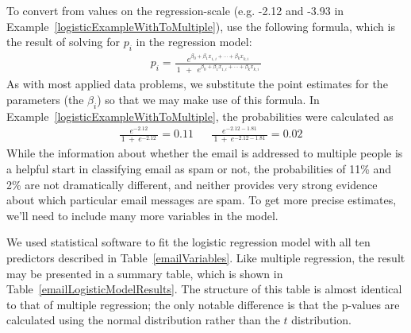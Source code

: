 To convert from values on the regression-scale (e.g. -2.12 and -3.93 in Example~\ref{logisticExampleWithToMultiple}), use the following formula, which is the result of solving for $p_i$ in the regression model:
\begin{align*}
p_i
	= \frac{e^{\beta_0 + \beta_1 x_{1,i}+\cdots+\beta_k x_{k,i}}}
		{\ 1\ \ +\ \ e^{\beta_0 + \beta_1 x_{1,i}+\cdots+\beta_k x_{k,i}}\ }
\end{align*}
As with most applied data problems, we substitute the point estimates for the parameters (the $\beta_i$) so that we may make use of this formula. In Example~\ref{logisticExampleWithToMultiple}, the probabilities were calculated as
\begin{align*}
&\frac{\ e^{-2.12}\ }{\ 1\ +\ e^{-2.12}\ } = 0.11 && \frac{\ e^{-2.12 - 1.81}\ }{\ 1\ +\ e^{-2.12 - 1.81}\ } = 0.02
\end{align*}
While the information about whether the email is addressed to multiple people is a helpful start in classifying email as spam or not, the probabilities of 11\% and 2\% are not dramatically different, and neither provides very strong evidence about which particular email messages are spam. To get more precise estimates, we'll need to include many more variables in the model.

We used statistical software to fit the logistic regression model with all ten predictors described in Table~\ref{emailVariables}. Like multiple regression, the result may be presented in a summary table, which is shown in Table~\ref{emailLogisticModelResults}. The structure of this table is almost identical to that of multiple regression; the only notable difference is that the p-values are calculated using the normal distribution rather than the $t$ distribution.

